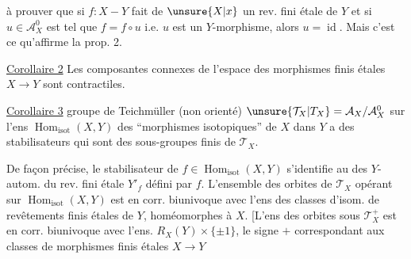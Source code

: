 à prouver que si $f:X\mathbin{-}Y$ fait de $\unsure{X|x}$ un rev. fini étale de $Y$ et si $u\in\mathcal{A}_X^0$ est tel que $f=f\circ u$ i.e. $u$ est un $Y$-morphisme, alors $u=\operatorname{id}$. Mais c'est ce qu'affirme la prop. 2.

\uline{Corollaire 2} Les composantes connexes de l'espace des morphismes finis étales $X\longrightarrow Y$ sont contractiles.

\uline{Corollaire 3}   groupe de Teichmüller (non orienté) $\unsure{\mathcal{T}_X|T_X}=\mathcal{A}_X/\mathcal{A}_X^0$ sur l'ens $\operatorname{Hom}_{\mathrm{isot}}(X,Y)$ des ``morphismes isotopiques'' de $X$ dans $Y$  a des stabilisateurs qui sont des sous-groupes finis de $\mathcal{T}_X$.

De façon précise, le stabilisateur de $f\in\operatorname{Hom}_{\mathrm{isot}}(X,Y)$ s'identifie au    des $Y$-autom. du rev. fini étale $Y'_f$ défini par $f$. L'ensemble des orbites de $\mathcal{T}_X$ opérant sur $\operatorname{Hom}_{\mathrm{isot}}(X,Y)$ est en corr. biunivoque avec l'ens  des classes d'isom. de revêtements finis étales de $Y$, homéomorphes à $X$.
[L'ens des orbites sous $\mathcal{T}_X^+$ est en corr. biunivoque avec l'ens. $R_X(Y)\times\{\pm1\}$, le signe $+$  correspondant aux classes de morphismes finis étales $X\longrightarrow Y$
